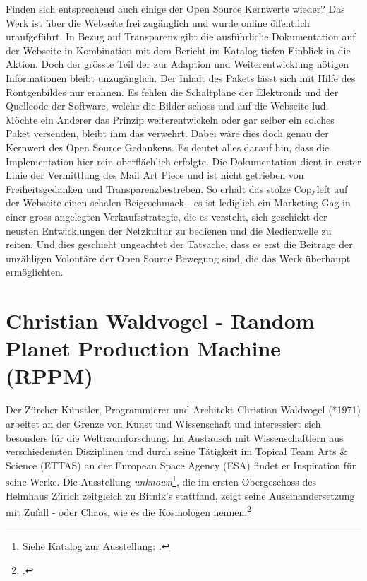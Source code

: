 \documentclass[
paper=164mm:234mm, %
pagesize, %
DIV=calc, %
10pt, %
parskip=half- %
]{scrbook}
\begin{document}
Finden sich entsprechend auch einige der Open Source Kernwerte wieder? Das Werk ist über die Webseite frei zugänglich und wurde online öffentlich uraufgeführt. In Bezug auf Transparenz gibt die ausführliche Dokumentation auf der Webseite in Kombination mit dem Bericht im Katalog tiefen Einblick in die Aktion. Doch der grösste Teil der zur Adaption und Weiterentwicklung nötigen Informationen bleibt unzugänglich. Der Inhalt des Pakets lässt sich mit Hilfe des Röntgenbildes nur erahnen. Es fehlen die Schaltpläne der Elektronik und der Quellcode der Software, welche die Bilder schoss und auf die Webseite lud. Möchte ein Anderer das Prinzip weiterentwickeln oder gar selber ein solches Paket versenden, bleibt ihm das verwehrt. Dabei wäre dies doch genau der Kernwert des Open Source Gedankens. Es deutet alles darauf hin, dass die Implementation hier rein oberflächlich erfolgte. Die Dokumentation dient in erster Linie der Vermittlung des Mail Art Piece und ist nicht getrieben von Freiheitsgedanken und Transparenzbestreben. So erhält das stolze Copyleft auf der Webseite einen schalen Beigeschmack - es ist lediglich ein Marketing Gag in einer gross angelegten Verkaufsstrategie, die es versteht, sich geschickt der neusten Entwicklungen der Netzkultur zu bedienen und die Medienwelle zu reiten. Und dies geschieht ungeachtet der Tatsache, dass es erst die Beiträge der unzähligen Volontäre der Open Source Bewegung sind, die das Werk überhaupt ermöglichten.

{}
\section*{Christian Waldvogel - Random Planet Production Machine (RPPM)}

Der Zürcher Künstler, Programmierer und Architekt Christian Waldvogel (*1971) arbeitet an der Grenze von Kunst und Wissenschaft und interessiert sich besonders für die Weltraumforschung. Im Austausch mit Wissenschaftlern aus verschiedensten Disziplinen und durch seine Tätigkeit im Topical Team Arts \& Science (ETTAS) an der European Space Agency (ESA) findet er Inspiration für seine Werke. Die Ausstellung \emph{unknown}\footnote{Siehe Katalog zur Ausstellung: \cite{Waldvogel:2014}.}, die im ersten Obergeschoss des Helmhaus Zürich zeitgleich zu Bitnik's stattfand, zeigt seine Auseinandersetzung mit Zufall - oder Chaos, wie es die Kosmologen nennen.\footnote{\cite[7-9]{Waldvogel:2014}.}
\end{document}
